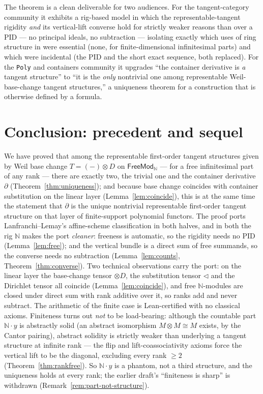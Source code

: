\documentclass[11pt]{article}
\theoremstyle{definition}
\newcommand{\FreeMod}{\mathsf{FreeMod}}
\newcommand{\N}{\mathbb{N}}
\begin{document}
The theorem is a clean deliverable for two audiences. For the tangent-category community
\cite{CockettCruttwell2014,LanfranchiLemay2025} it exhibits a rig-based model in which the
representable-tangent rigidity \emph{and} its vertical-lift converse hold for strictly weaker
reasons than over a PID --- no principal ideals, no subtraction --- isolating exactly which uses of
ring structure in \cite{LanfranchiLemay2025} were essential (none, for finite-dimensional
infinitesimal parts) and which were incidental (the PID and the short exact sequence, both
replaced). For the \texttt{Poly} and containers community \cite{AAGM2003,AhmanUustalu2016} it
upgrades ``the container derivative is \emph{a} tangent structure'' \cite{MacBethTangent} to ``it is
the \emph{only} nontrivial one among representable Weil-base-change tangent structures,'' a uniqueness
theorem for a construction that is otherwise defined by a formula.

\section{Conclusion: precedent and sequel}\label{sec:conclusion}

We have proved that among the representable first-order tangent structures given by Weil base change
$T=(-)\otimes D$ on $\FreeMod_\N$ --- for a free infinitesimal part of any rank ---
there are exactly two, the trivial one and the container derivative $\partial$
(Theorem~\ref{thm:uniqueness}); and because base change coincides with container substitution on the
linear layer (Lemma~\ref{lem:coincide}), this is at the same time the statement that $\partial$ is
the unique nontrivial representable first-order tangent structure on that layer of finite-support
polynomial functors. The proof ports Lanfranchi--Lemay's affine-scheme classification in both halves,
and in both the rig $\N$ makes the port \emph{cleaner}: freeness is automatic, so the rigidity needs
no PID (Lemma~\ref{lem:free}); and the vertical bundle is a direct sum of free summands, so the
converse needs no subtraction (Lemma~\ref{lem:counts}, Theorem~\ref{thm:converse}). Two technical observations carry
the port: on the linear layer the base-change tensor $\otimes D$, the substitution tensor $\lhd$ and
the Dirichlet tensor all coincide (Lemma~\ref{lem:coincide}), and free $\N$-modules are closed under
direct sum with rank additive over it, so ranks add and never subtract. The arithmetic of the finite case is Lean-certified with no classical axioms. Finiteness
turns out \emph{not} to be load-bearing: although the countable part $\N\cdot y$ is abstractly solid
(an abstract isomorphism $M\otimes M\cong M$ exists, by the Cantor pairing), abstract solidity is strictly weaker
than underlying a tangent structure at infinite rank --- the flip and lift-coassociativity axioms
force the vertical lift to be the diagonal, excluding every rank $\ge2$
(Theorem~\ref{thm:rankfree}). So $\N\cdot y$ is a phantom, not a third structure,
and the uniqueness holds at every rank; the earlier draft's ``finiteness is sharp'' is withdrawn
(Remark~\ref{rem:part-not-structure}).
\end{document}
